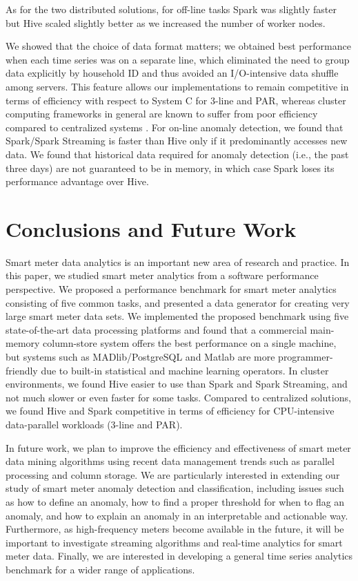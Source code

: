 \documentclass[prodmode,acmtods]{acmsmall}
\begin{document}
As for the two distributed solutions, for off-line tasks Spark was slightly faster but Hive scaled slightly better as we increased the number of worker nodes.  

We showed that the choice of data format matters; we obtained best performance when each time series was on a separate line, which eliminated the need to group data explicitly by household ID and thus avoided an I/O-intensive data shuffle among servers.
This feature allows our implementations to remain competitive in terms of efficiency with respect to System C for 3-line and PAR,
whereas cluster computing frameworks in general are known to suffer from poor efficiency compared to centralized systems \cite{efficiency}.  For on-line anomaly detection, we found that Spark/Spark Streaming is faster than Hive only if it predominantly accesses new data.  We found that historical data required for anomaly detection (i.e., the past three days) are not guaranteed to be in memory, in which case Spark loses its performance advantage over Hive.


\section{Conclusions and Future Work}
\label{sec:conclusion}

Smart meter data analytics is an important new area of research and practice.  In this paper, we studied smart meter analytics from a software performance perspective.  We proposed a performance benchmark for smart meter analytics consisting of five common tasks, and presented a data generator for creating very large smart meter data sets.  We implemented the proposed benchmark using five state-of-the-art data processing platforms and found that a commercial main-memory column-store system offers the best performance on a single machine, but systems such as MADlib/PostgreSQL and Matlab are more programmer-friendly due to built-in statistical and machine learning operators.  In cluster environments, we found Hive easier to use than Spark and Spark Streaming, and not much slower or even faster for some tasks.  Compared to centralized solutions, we found Hive and Spark competitive in terms of efficiency for CPU-intensive data-parallel workloads (3-line and PAR).

In future work, we plan to improve the efficiency and effectiveness of smart meter data mining algorithms using recent data management trends such as parallel processing and column storage.  We are particularly interested in extending our study of smart meter anomaly detection and classification, including issues such as how to define an anomaly, how to find a proper threshold for when to flag an anomaly, and how to explain an anomaly in an interpretable and actionable way.  Furthermore, as high-frequency meters become available in the future, it will be important to investigate streaming algorithms and real-time analytics for smart meter data.  Finally, we are interested in developing a general time series analytics benchmark for a wider range of applications.
\end{document}
